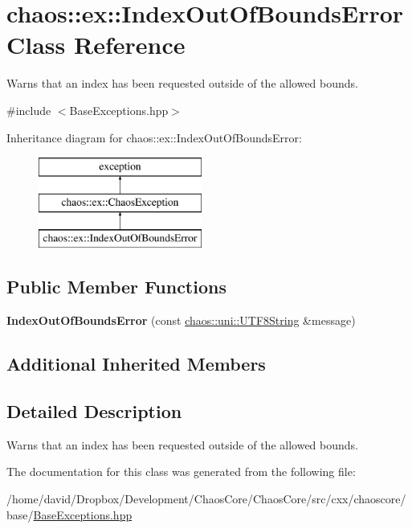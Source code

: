 \hypertarget{classchaos_1_1ex_1_1_index_out_of_bounds_error}{\section{chaos\-:\-:ex\-:\-:Index\-Out\-Of\-Bounds\-Error Class Reference}
\label{classchaos_1_1ex_1_1_index_out_of_bounds_error}
}


Warns that an index has been requested outside of the allowed bounds.  




{\ttfamily \#include $<$Base\-Exceptions.\-hpp$>$}

Inheritance diagram for chaos\-:\-:ex\-:\-:Index\-Out\-Of\-Bounds\-Error\-:\begin{figure}[H]
\begin{center}
\leavevmode
\includegraphics[height=3.000000cm]{classchaos_1_1ex_1_1_index_out_of_bounds_error}
\end{center}
\end{figure}
\subsection*{Public Member Functions}
\begin{DoxyCompactItemize}
\item 
\hypertarget{classchaos_1_1ex_1_1_index_out_of_bounds_error_a1af2cf3f2449988f9780d7205c63062b}{{\bfseries Index\-Out\-Of\-Bounds\-Error} (const \hyperlink{classchaos_1_1uni_1_1_u_t_f8_string}{chaos\-::uni\-::\-U\-T\-F8\-String} \&message)}\label{classchaos_1_1ex_1_1_index_out_of_bounds_error_a1af2cf3f2449988f9780d7205c63062b}

\end{DoxyCompactItemize}
\subsection*{Additional Inherited Members}


\subsection{Detailed Description}
Warns that an index has been requested outside of the allowed bounds. 

The documentation for this class was generated from the following file\-:\begin{DoxyCompactItemize}
\item 
/home/david/\-Dropbox/\-Development/\-Chaos\-Core/\-Chaos\-Core/src/cxx/chaoscore/base/\hyperlink{_base_exceptions_8hpp}{Base\-Exceptions.\-hpp}\end{DoxyCompactItemize}
